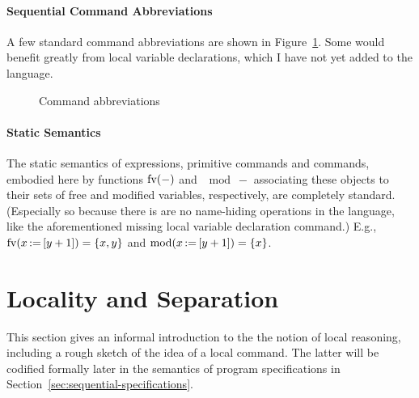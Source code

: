 \documentclass[11pt]{report}
\begin{document}
\paragraph{Sequential Command Abbreviations} A few standard command abbreviations are shown in Figure~\ref{fig:sequential-command-abbreviations}. Some would benefit greatly from local variable declarations, which I have not yet added to the language. 

\begin{figure}[ht]
    \centering
    \caption{\label{fig:sequential-command-abbreviations} Command abbreviations}
\end{figure}

\paragraph{Static Semantics} The static semantics of expressions, primitive commands and commands, embodied here by functions $\mathrm{fv}(-)$ and $\mod{-}$ associating these objects to their sets of free and modified variables, respectively, are completely standard. (Especially so because there is are no name-hiding operations in the language, like the aforementioned missing local variable declaration command.) E.g., $\mathrm{fv}(x \operatorname{:\!=} \left[ y+1 \right]) = \left\lbrace x,y \right\rbrace$ and $\mathrm{mod}(x \operatorname{:\!=} \left[ y+1 \right]) = \left\lbrace x \right\rbrace$.  

\section{Locality and Separation}
\label{sec:locality}

This section gives an informal introduction to the the notion of local reasoning, including a rough sketch of the idea of a local command. The latter will be codified formally later in the semantics of program specifications in Section~\ref{sec:sequential-specifications}. 
\end{document}
